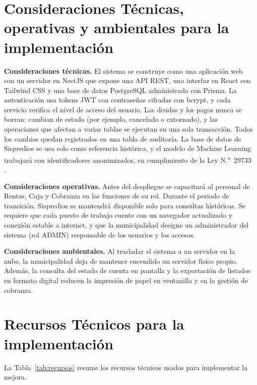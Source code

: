 \documentclass[12pt,a4paper]{report}
\begin{document}
\section{Consideraciones Técnicas, operativas y ambientales para la implementación}

\noindent\textbf{Consideraciones técnicas.} El sistema se construye como una aplicación web con un servidor en NestJS que expone una API REST, una interfaz en React con Tailwind CSS y una base de datos PostgreSQL administrada con Prisma. La autenticación usa tokens JWT con contraseñas cifradas con bcrypt, y cada servicio verifica el nivel de acceso del usuario. Las deudas y los pagos nunca se borran: cambian de estado (por ejemplo, cancelado o extornado), y las operaciones que afectan a varias tablas se ejecutan en una sola transacción. Todos los cambios quedan registrados en una tabla de auditoría. La base de datos de Sispredios se usa solo como referencia histórica, y el modelo de Machine Learning trabajará con identificadores anonimizados, en cumplimiento de la Ley N.\textsuperscript{o}~29733 \parencite{ley29733}.

\noindent\textbf{Consideraciones operativas.} Antes del despliegue se capacitará al personal de Rentas, Caja y Cobranza en las funciones de su rol. Durante el periodo de transición, Sispredios se mantendrá disponible solo para consultas históricas. Se requiere que cada puesto de trabajo cuente con un navegador actualizado y conexión estable a internet, y que la municipalidad designe un administrador del sistema (rol ADMIN) responsable de los usuarios y los accesos.

\noindent\textbf{Consideraciones ambientales.} Al trasladar el sistema a un servidor en la nube, la municipalidad deja de mantener encendido un servidor físico propio. Además, la consulta del estado de cuenta en pantalla y la exportación de listados en formato digital reducen la impresión de papel en ventanilla y en la gestión de cobranza.

\section{Recursos Técnicos para la implementación}

La Tabla~\ref{tab:recursos} resume los recursos técnicos usados para implementar la mejora.
\end{document}

